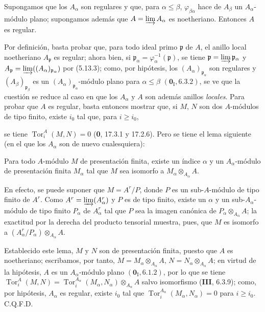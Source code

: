 \begin{proposition}[5.13.7]
\label{IV.2.s5.13.7-fr}
Supongamos que los $A_\alpha$ son regulares y que, para
$\alpha\leq\beta$, $\varphi_{\beta\alpha}$ hace de $A_\beta$ un
$A_\alpha$-módulo plano; supongamos además que
$A=\varinjlim A_\alpha$ es noetheriano. Entonces $A$ es regular.
\end{proposition}

Por definición, basta probar que, para todo ideal primo $\mathfrak p$ de $A$,
el anillo local noetheriano $A_{\mathfrak p}$ es regular; ahora bien, si
$\mathfrak p_\alpha=\varphi_\alpha^{-1}(\mathfrak p)$, se tiene
$\mathfrak p=\varinjlim\mathfrak p_\alpha$ y
$A_{\mathfrak p}=\varinjlim((A_\alpha)_{\mathfrak p_\alpha})$ por (5.13.3);
como, por hipótesis, los $(A_\alpha)_{\mathfrak p_\alpha}$ son regulares y
$(A_\beta)_{\mathfrak p_\beta}$ es un
$(A_\alpha)_{\mathfrak p_\alpha}$-módulo plano para
$\alpha\leq\beta$ $(\mathbf{0}_{\mathrm I}, 6.3.2)$, se ve que la cuestión se reduce al
caso en que los $A_\alpha$ y $A$ son además anillos \emph{locales}. Para probar que
$A$ es regular, basta entonces mostrar que, si $M$, $N$ son dos $A$-módulos de
tipo finito, existe $i_0$ tal que, para $i\geq i_0$,


se tiene $\operatorname{Tor}^A_i(M,N)=0$ (\textbf 0, 17.3.1 y 17.2.6). Pero se tiene
el lema siguiente (en el que los $A_\alpha$ son de nuevo cualesquiera):

\begin{lemma}[5.13.7.1]
\label{IV.2.s5.13.7.1-fr}
Para todo $A$-módulo $M$ de presentación finita, existe un índice $\alpha$ y
un $A_\alpha$-módulo de presentación finita $M_\alpha$ tal que $M$ sea
isomorfo a $M_\alpha\otimes_{A_\alpha}A$.
\end{lemma}

En efecto, se puede suponer que $M=A^r/P$, donde $P$ es un sub-$A$-módulo de
tipo finito de $A^r$. Como $A^r=\varinjlim(A_\alpha^r)$ y $P$ es de tipo
finito, existe un $\alpha$ y un sub-$A_\alpha$-módulo de tipo finito
$P_\alpha$ de $A_\alpha^r$ tal que $P$ sea la imagen canónica de
$P_\alpha\otimes_{A_\alpha}A$; la exactitud por la derecha del producto
tensorial muestra, pues, que $M$ es isomorfo a
$(A_\alpha^r/P_\alpha)\otimes_{A_\alpha}A$.

Establecido este lema, $M$ y $N$ son de presentación finita, puesto que $A$ es
noetheriano; escribamos, por tanto,
$M=M_\alpha\otimes_{A_\alpha}A$,
$N=N_\alpha\otimes_{A_\alpha}A$; en virtud de la hipótesis, $A$ es un
$A_\alpha$-módulo plano $(\mathbf{0}_{\mathrm I}, 6.1.2)$, por lo que se tiene
$\operatorname{Tor}^A_i(M,N)
=\operatorname{Tor}^{A_\alpha}_i(M_\alpha,N_\alpha)
 \otimes_{A_\alpha}A$
salvo isomorfismo (\textbf{III}, 6.3.9); como, por hipótesis, $A_\alpha$ es regular,
existe $i_0$ tal que
$\operatorname{Tor}^{A_\alpha}_i(M_\alpha,N_\alpha)=0$ para $i\geq i_0$.
C.Q.F.D.

